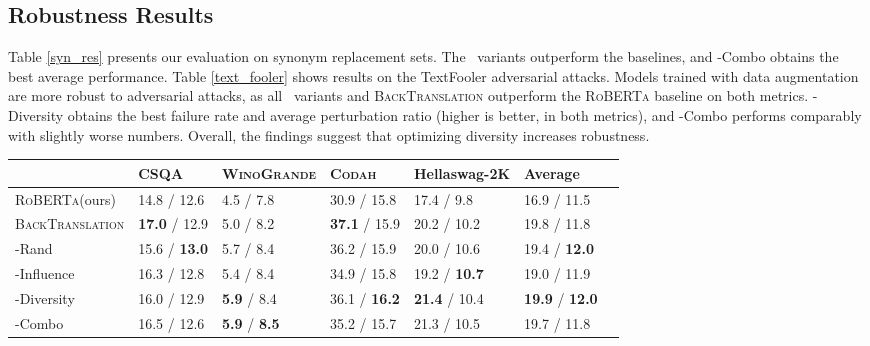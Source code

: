 \documentclass[11pt,a4paper]{article}
\newcommand{\gdaug}{}
\newcommand{\winogrande}{\textsc{WinoGrande}\xspace}
\newcommand{\codah}{\textsc{Codah}\xspace}
\newcommand{\roberta}{\textsc{RoBERTa}\xspace}
\newcommand{\backt}{\textsc{BackTranslation}\xspace}
\begin{document}
\subsection{Robustness Results}

Table \ref{syn_res} presents our evaluation on synonym replacement sets. 
The \gdaug\ variants outperform the baselines, and \gdaug-Combo obtains the best average performance. 
Table \ref{text_fooler} shows results on the TextFooler adversarial attacks. Models trained with data augmentation are more robust to adversarial attacks, as all \gdaug\ variants and \backt outperform the \roberta baseline on both metrics.
\gdaug-Diversity obtains the best failure rate and average perturbation ratio (higher is better, in both metrics), and 
\gdaug-Combo performs comparably with slightly worse numbers. Overall, the findings suggest that optimizing diversity increases robustness.


\begin{table*}[]
\small
\centering
\begin{tabular}{lllllll}
              & CSQA & \winogrande & \codah & Hellaswag-2K & \textbf{Average} \\ 
\toprule
\roberta (ours)               & 14.8 / 12.6 & 4.5 / 7.8       & 30.9 / 15.8  & 17.4 / 9.8               & 16.9 / 11.5                 \\ 
\backt     & \textbf{17.0} / 12.9   & 5.0 / 8.2       & \textbf{37.1} / 15.9  & 20.2 / 10.2              & 19.8 / 11.8                \\ 
\midrule
\gdaug-Rand      &15.6 / \textbf{13.0}  &5.7 / 8.4        &36.2 / 15.9  & 20.0 / 10.6         & 19.4 / \textbf{12.0}                \\ 
\gdaug-Influence &16.3 / 12.8    & 5.4 / 8.4       & 34.9 / 15.8  & 19.2 / \textbf{10.7}            &19.0 / 11.9                  \\ 
\gdaug-Diversity &16.0 / 12.9 & \textbf{5.9} / 8.4      & 36.1 / \textbf{16.2}  & \textbf{21.4} / 10.4             & \textbf{19.9} / \textbf{12.0}                 \\ 
\gdaug-Combo     & 16.5 / 12.6   & \textbf{5.9} / \textbf{8.5}      & 35.2 / 15.7  & 21.3 / 10.5             &19.7 / 11.8                \\ 
\bottomrule
\end{tabular}
\caption{Robustness to TextFooler-based adversarial attacks (failure rate / average perturbation ratio, higher is better for both). 
Models trained with augmented data are more robust to TextFooler's attacks compared to models without data augmentation. On average, \gdaug-Diversity performs the best. }
\label{text_fooler}
\end{table*}
 
\end{document}
